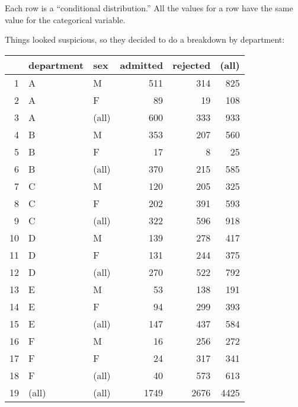 \documentclass[landscape]{exam}
\begin{document}
  Each row is a ``conditional distribution.'' All the values for a row have the
  same value for the categorical variable.

  Things looked suspicious, so they decided to do a breakdown by department:

  \begin{table}[H]
    \centering
    \begin{tabular}{rllrrr}
      \toprule
                 & department & sex   & admitted & rejected & (all) \\
      \midrule
      1          & A          & M     & 511      & 314      & 825 \\
      2          & A          & F     & 89       & 19       & 108 \\
      3          & A          & (all) & 600      & 333      & 933 \\
      \midrule
      4          & B          & M     & 353      & 207      & 560 \\
      5          & B          & F     & 17       & 8        & 25 \\
      6          & B          & (all) & 370      & 215      & 585 \\
      \midrule
      7          & C          & M     & 120      & 205      & 325 \\
      8          & C          & F     & 202      & 391      & 593 \\
      9          & C          & (all) & 322      & 596      & 918 \\
      \midrule
      10         & D          & M     & 139      & 278      & 417 \\
      11         & D          & F     & 131      & 244      & 375 \\
      12         & D          & (all) & 270      & 522      & 792 \\
      \midrule
      13         & E          & M     & 53       & 138      & 191 \\
      14         & E          & F     & 94       & 299      & 393 \\
      15         & E          & (all) & 147      & 437      & 584 \\
      \midrule
      16         & F          & M     & 16       & 256      & 272 \\
      17         & F          & F     & 24       & 317      & 341 \\
      18         & F          & (all) & 40       & 573      & 613 \\
      \midrule
      19         & (all)      & (all) & 1749     & 2676     & 4425 \\
      \bottomrule
    \end{tabular}
  \end{table}
\end{document}
